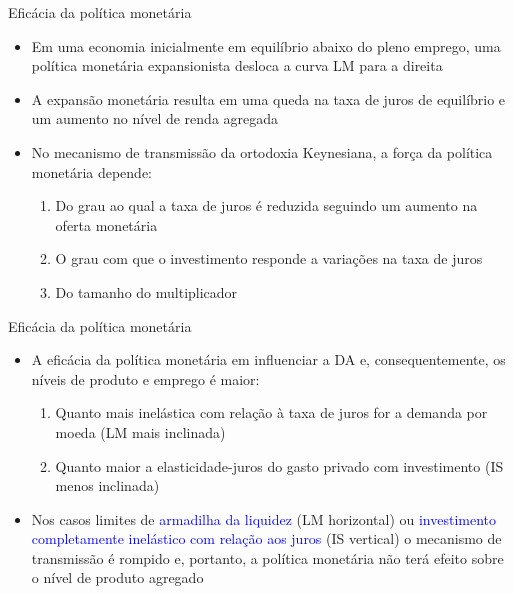 \documentclass[10pt]{beamer}
\begin{document}
\begin{frame}{Eficácia da política monetária}
    \begin{itemize}
        \item Em uma economia inicialmente em equilíbrio abaixo do pleno emprego, uma política monetária expansionista desloca a curva LM para a direita
        \bigskip
        \item A expansão monetária resulta em uma queda na taxa de juros de equilíbrio e um aumento no nível de renda agregada
        \bigskip
        \item No mecanismo de transmissão da ortodoxia Keynesiana, a força da política monetária depende:
        \bigskip
        \begin{enumerate}
            \item Do grau ao qual a taxa de juros é reduzida seguindo um aumento na oferta monetária
            \medskip
            \item O grau com que o investimento responde a variações na taxa de juros
            \medskip
            \item Do tamanho do multiplicador
        \end{enumerate}
    \end{itemize}
\end{frame}

\begin{frame}{Eficácia da política monetária}
    \begin{itemize}
        \item A eficácia da política monetária em influenciar a DA e, consequentemente, os níveis de produto e emprego é maior:
        \bigskip
        \begin{enumerate}
            \item Quanto mais inelástica com relação à taxa de juros for a demanda por moeda (LM mais inclinada)
            \medskip
            \item Quanto maior a elasticidade-juros do gasto privado com investimento (IS menos inclinada)
        \end{enumerate}
        \bigskip
        \item Nos casos limites de \textcolor{blue}{armadilha da liquidez} (LM horizontal) ou \textcolor{blue}{investimento completamente inelástico com relação aos juros} (IS vertical) o mecanismo de transmissão é rompido e, portanto, a política monetária não terá efeito sobre o nível de produto agregado
    \end{itemize}
\end{frame}
\end{document}
